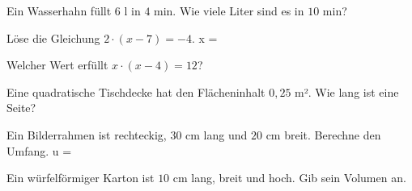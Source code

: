 \documentclass[11pt]{article}
\begin{document}
\noindent\begin{minipage}[t]{0.485\linewidth}\raggedright
\begin{aufgabe}{Ein Wasserhahn füllt $6$ l in $4$ min. Wie viele Liter sind es in $10$ min? \leerfeld[l]}
\end{aufgabe}
\end{minipage}\hfill\begin{minipage}[t]{0.485\linewidth}\raggedright
\begin{aufgabe}{Löse die Gleichung $2 \cdot (x - 7) = -4$. x = \leerfeld}
\end{aufgabe}
\end{minipage}\par

\noindent\begin{minipage}[t]{0.485\linewidth}\raggedright
\begin{aufgabe}{Welcher Wert erfüllt $x \cdot (x - 4) = 12$? \\    }
\end{aufgabe}
\end{minipage}\hfill\begin{minipage}[t]{0.485\linewidth}\raggedright
\begin{aufgabe}{Eine quadratische Tischdecke hat den Flächeninhalt $0{,}25$ m². Wie lang ist eine Seite? \leerfeld[m]}
\end{aufgabe}
\end{minipage}\par

\noindent\begin{minipage}[t]{0.485\linewidth}\raggedright
\begin{aufgabe}{Ein Bilderrahmen ist rechteckig, $30$ cm lang und $20$ cm breit. Berechne den Umfang. u = \leerfeld[cm]}
\end{aufgabe}
\end{minipage}\hfill\begin{minipage}[t]{0.485\linewidth}\raggedright
\begin{aufgabe}{Ein würfelförmiger Karton ist $10$ cm lang, breit und hoch. Gib sein Volumen an. \leerfeld[cm³]}
\end{aufgabe}
\end{minipage}\par
\end{document}
